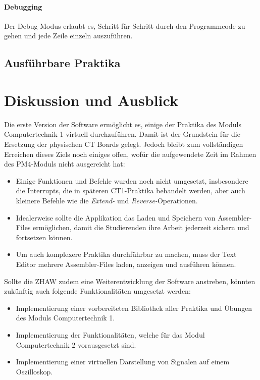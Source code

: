 \documentclass[10pt]{article}
\begin{document}
\paragraph{Debugging} Der Debug-Modus erlaubt es, Schritt für Schritt durch den Programmcode zu gehen und jede Zeile einzeln auszuführen.

\subsection{Ausführbare Praktika}


\section{Diskussion und Ausblick}

Die erste Version der Software ermöglicht es, einige der Praktika des Moduls \glqq Computertechnik 1\grqq{} virtuell durchzuführen. Damit ist der Grundstein für die Ersetzung der physischen CT Boards gelegt. Jedoch bleibt zum vollständigen Erreichen dieses Ziels noch einiges offen, wofür die aufgewendete Zeit im Rahmen des PM4-Moduls nicht ausgereicht hat:

\begin{itemize}
	\item Einige Funktionen und Befehle wurden noch nicht umgesetzt, insbesondere die Interrupts, die in späteren CT1-Praktika behandelt werden, aber auch kleinere Befehle wie die \emph{Extend-} und \emph{Reverse-}Operationen.
	\item Idealerweise sollte die Applikation das Laden und Speichern von Assembler-Files ermöglichen, damit die Studierenden ihre Arbeit jederzeit sichern und fortsetzen können.
	\item Um auch komplexere Praktika durchführbar zu machen, muss der Text Editor mehrere Assembler-Files laden, anzeigen und ausführen können.


\end{itemize}


Sollte die ZHAW zudem eine Weiterentwicklung der Software anstreben, könnten zukünftig auch folgende Funktionalitäten umgesetzt werden: 
\begin{itemize}
\item Implementierung einer vorbereiteten Bibliothek aller Praktika und Übungen des Moduls \glqq Computertechnik 1\grqq. 
\item Implementierung der Funktionalitäten, welche für das Modul \glqq Computertechnik 2\grqq{} vorausgesetzt sind. 
\item Implementierung einer virtuellen Darstellung von Signalen auf einem Oszilloskop.
\end{itemize}
\end{document}
